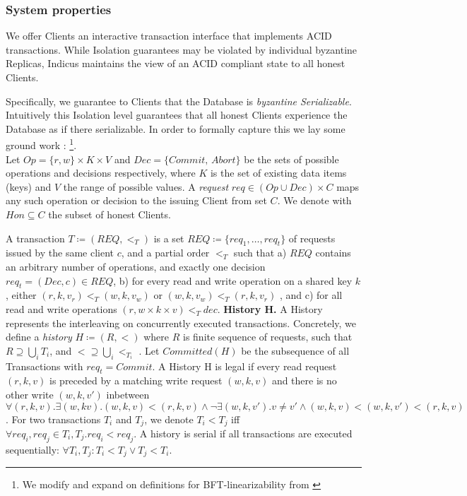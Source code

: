 \subsubsection{System properties}
We offer Clients an interactive transaction interface that implements ACID transactions. While  Isolation guarantees may be violated by individual byzantine Replicas, Indicus maintains the view of an ACID compliant state to all honest Clients. 

Specifically, we guarantee to Clients that the Database is \textit{byzantine Serializable}. Intuitively this Isolation level guarantees that all honest Clients experience the Database as if there serializable. In order to formally capture this we lay some ground work \cite{bernstein1987concurrency}: \footnote{We modify and expand on definitions for BFT-linearizability from \cite{liskov2006tolerating}}.\\

Let $Op =  \{r, w\} \times K \times V $ and $Dec = \{Commit, \,Abort\}$ be the sets of possible operations and decisions respectively, where $K$ is the set of existing data items (keys) and $V$ the range of possible values. A \textit{request} $req \in (Op \cup Dec) \times C$ maps any such operation or decision to the issuing Client from set $C$. We denote with $Hon \subseteq C$ the subset of honest Clients. 

A transaction $T \coloneqq (REQ, <_T)$ is a set $REQ \coloneqq \{req_1, \dots, req_t \}$ of requests issued by the same client $c$, and a partial order $<_T$ such that a) $REQ$ contains an arbitrary number of operations, and exactly one decision $req_t = (Dec, c) \in REQ$, b) for every read and write operation on a shared key $k$, either $(r, k, v_r) <_T (w, k, v_w)$ or $(w, k, v_w) <_T (r, k, v_r)$ , and c) for all read and write operations $({r,w} \times k \times v) <_T dec$.
\textbf{History H.} A History represents the interleaving on concurrently executed transactions. Concretely, we define a \textit{history} $H \coloneqq (R, <)$ where $R$ is finite sequence of
requests, such that $R \supseteq \bigcup_i T_i$, and $< \supseteq \bigcup_i <_{T_i}$ .
Let $Committed(H)$ be the subsequence of all Transactions with $req_{t} = Commit$. A History H is legal if every read request $(r, k, v)$ is preceded by a matching write request $(w, k, v)$ and there is no other write $(w, k, v')$ inbetween  $\forall (r, k, v).\exists (w, k v). (w,k,v) < (r,k,v) \land \neg \exists (w, k, v'). v\neq v' \land (w, k,v) < (w,k, v') < (r, k, v)$. For two transactions $T_i$ and $T_j$, we denote $T_i < T_j$ iff $\forall req_i, req_j \in T_i, T_j. req_i < req_j$. A history is serial if all transactions are executed sequentially: $\forall T_i, T_j: T_i < T_j \lor T_j < T_i$.

